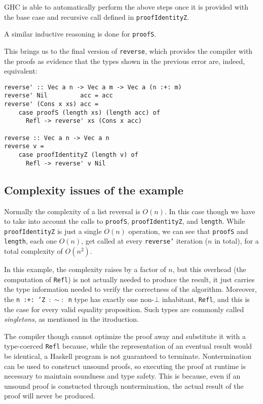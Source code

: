 GHC is able to automatically perform the above steps once it is provided with the base case and recursive call defined in \texttt{proofIdentityZ}.

A similar inductive reasoning is done for \texttt{proofS}.

This brings us to the final version of \texttt{reverse}, which provides the compiler with the proofs as evidence that the types shown in the previous error are, indeed, equivalent:

\begin{lstlisting}[label=lst:reversal-final,caption=Length-indexed vector reversal]
reverse' :: Vec a n -> Vec a m -> Vec a (n :+: m)
reverse' Nil         acc = acc
reverse' (Cons x xs) acc =
    case proofS (length xs) (length acc) of
      Refl -> reverse' xs (Cons x acc)

reverse :: Vec a n -> Vec a n
reverse v =
    case proofIdentityZ (length v) of
      Refl -> reverse' v Nil
\end{lstlisting}

\subsection{Complexity issues of the example}
\label{subsec:complexity-issues}

Normally the complexity of a list reversal is $O(n)$.
In this case though we have to take into account the calls to \texttt{proofS}, \texttt{proofIdentityZ}, and \texttt{length}.
While \texttt{proofIdentityZ} is just a single $O(n)$ operation, we can see that \texttt{proofS} and \texttt{length}, each one $O(n)$, get called at every \texttt{reverse'} iteration ($n$ in total), for a total complexity of $O(n^2)$.

In this example, the complexity raises by a factor of $n$, but this overhead (the computation of \texttt{Refl}) is not actually needed to produce the result, it just carries the type information needed to verify the correctness of the algorithm.
Moreover, the \texttt{n :+: 'Z $:\sim:$ n} type has exactly one non-$\bot$ inhabitant, \texttt{Refl}, and this is the case for every valid equality proposition. Such types are commonly called \emph{singletons}, as mentioned in the itroduction.

The compiler though cannot optimize the proof away and substitute it with a type-coerced \texttt{Refl} because, while the representation of an eventual result would be identical, a Haskell program is not guaranteed to terminate. Nontermination can be used to construct unsound proofs, so executing the proof at runtime is necessary to maintain soundness and type safety.
This is because, even if an unsound proof is constucted through nontermination, the actual result of the proof will never be produced.


